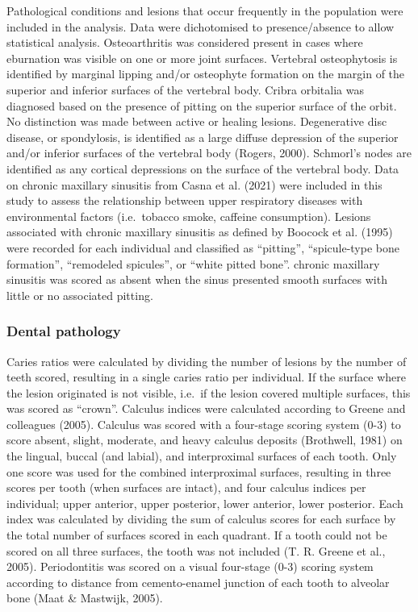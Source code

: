 \documentclass[
  letterpaper,
]{book}
\begin{document}
Pathological conditions and lesions that occur frequently in the
population were included in the analysis. Data were dichotomised to
presence/absence to allow statistical analysis. Osteoarthritis was
considered present in cases where eburnation was visible on one or more
joint surfaces. Vertebral osteophytosis is identified by marginal
lipping and/or osteophyte formation on the margin of the superior and
inferior surfaces of the vertebral body. Cribra orbitalia was diagnosed
based on the presence of pitting on the superior surface of the orbit.
No distinction was made between active or healing lesions. Degenerative
disc disease, or spondylosis, is identified as a large diffuse
depression of the superior and/or inferior surfaces of the vertebral
body (Rogers, 2000). Schmorl's nodes are identified as any cortical
depressions on the surface of the vertebral body. Data on chronic
maxillary sinusitis from Casna et al. (2021) were included in this study
to assess the relationship between upper respiratory diseases with
environmental factors (i.e.~tobacco smoke, caffeine consumption).
Lesions associated with chronic maxillary sinusitis as defined by
Boocock et al. (1995) were recorded for each individual and classified
as ``pitting'', ``spicule-type bone formation'', ``remodeled spicules'',
or ``white pitted bone''. chronic maxillary sinusitis was scored as
absent when the sinus presented smooth surfaces with little or no
associated pitting.

\hypertarget{dental-pathology}{%
\subsubsection{Dental pathology}\label{dental-pathology}}

Caries ratios were calculated by dividing the number of lesions by the
number of teeth scored, resulting in a single caries ratio per
individual. If the surface where the lesion originated is not visible,
i.e.~if the lesion covered multiple surfaces, this was scored as
``crown''. Calculus indices were calculated according to Greene and
colleagues (2005). Calculus was scored with a four-stage scoring system
(0-3) to score absent, slight, moderate, and heavy calculus deposits
(Brothwell, 1981) on the lingual, buccal (and labial), and interproximal
surfaces of each tooth. Only one score was used for the combined
interproximal surfaces, resulting in three scores per tooth (when
surfaces are intact), and four calculus indices per individual; upper
anterior, upper posterior, lower anterior, lower posterior. Each index
was calculated by dividing the sum of calculus scores for each surface
by the total number of surfaces scored in each quadrant. If a tooth
could not be scored on all three surfaces, the tooth was not included
(T. R. Greene et al., 2005). Periodontitis was scored on a visual
four-stage (0-3) scoring system according to distance from
cemento-enamel junction of each tooth to alveolar bone (Maat \&
Mastwijk, 2005).
\end{document}
